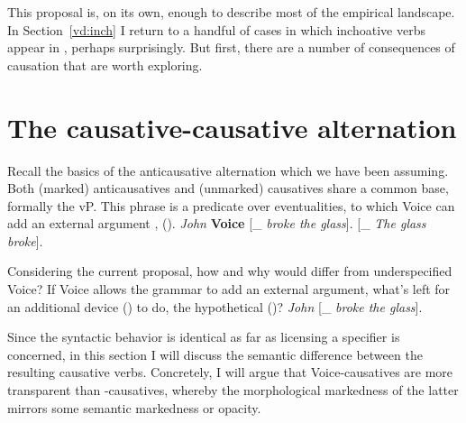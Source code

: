 This proposal is, on its own, enough to describe most of the empirical landscape. In Section~\ref{vd:inch} I return to a handful of cases in which inchoative verbs appear in {\thif}, perhaps surprisingly. But first, there are a number of consequences of causation that are worth exploring.

		


\section{The causative-causative alternation} \label{vd:caus}
Recall the basics of the anticausative alternation which we have been assuming. Both (marked) anticausatives and (unmarked) causatives share a common base, formally the vP. This phrase is a predicate over eventualities, to which Voice can add an external argument \citep{schaefer08,layering15}, (\nextx).
\pex 
	\a \emph{John} \textbf{Voice} [_{} \emph{broke the glass}].
	\a \textbf{\vz} [_{} \emph{The glass broke}].
\xe

Considering the current proposal, how and why would {\vd} differ from underspecified Voice? If Voice allows the grammar to add an external argument, what's left for an additional device (\vd) to do, the hypothetical (\nextx)?
\ex \emph{John} \textbf{\vd} [_{} \emph{broke the glass}].
\xe

Since the syntactic behavior is identical as far as licensing a specifier is concerned, in this section I will discuss the semantic difference between the resulting causative verbs. Concretely, I will argue that Voice-causatives are more transparent than {\vd}-causatives, whereby the morphological markedness of the latter mirrors some semantic markedness or opacity.

